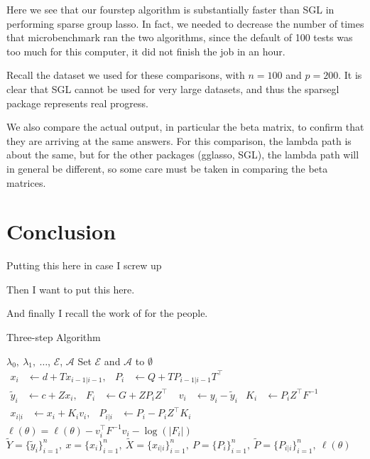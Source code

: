 \documentclass[titlepage]{article}
\begin{document}
Here we see that our fourstep algorithm is substantially faster than SGL in performing sparse group lasso. In fact, we needed to decrease the number of times that microbenchmark ran the two algorithms, since the default of 100 tests was too much for this computer, it did not finish the job in an hour.

Recall the dataset we used for these comparisons, with $n=100$ and $p=200$. It is clear that SGL cannot be used for very large datasets, and thus the sparsegl package represents real progress.


We also compare the actual output, in particular the beta matrix, to confirm that they are arriving at the same answers. For this comparison, the lambda path is about the same, but for the other packages (gglasso, SGL), the lambda path will in general be different, so some care must be taken in comparing the beta matrices.

\section{Conclusion}


Putting this here in case I screw up \citep{tibshirani2012strong}

Then I want to put this \citep{yang2015fast} here.

And finally I recall the work of \citep{simon2013sparse} for the people.

\begin{algorithm}
  \caption{Three-step Algorithm\label{alg:kalman}}
  \begin{algorithmic}
     $\lambda_0,\ \lambda_1,\ \dots$, $\mathcal{E}$, $\mathcal{A}$
    \STATE Set $\mathcal{E}$ and $\mathcal{A}$ to $\emptyset$ 
    \STATE $\begin{aligned} x_{i}
      &\leftarrow d + T x_{i-1|i-1}, & P_i &\leftarrow Q + T P_{i-1|i-1}
      T^\top\end{aligned}$ 
    \STATE $\begin{aligned}\widetilde{y}_i
      &\leftarrow c + Z  x_i, & F_i &\leftarrow G + Z P_i
      Z^\top\end{aligned}$ 
    \STATE $\begin{aligned}v_i&\leftarrow y_i-\widetilde{y}_i& K_i&
      \leftarrow P_i Z^\top F^{-1}\end{aligned}$ 
    \STATE $\begin{aligned} x_{i|i}
      &\leftarrow  x_i + K_i v_i, & P_{i|i} &\leftarrow P_i - P_iZ^\top
      K_i\end{aligned}$ 
    \STATE $\ell(\theta) = \ell(\theta) -v_i^\top F^{-1}v_i - \log(|F_i|)$
    \ENDFOR
    \RETURN $\widetilde{Y}=\{\widetilde{y}_i\}_{i=1}^n,\  x=\{ x_i\}_{i=1}^n,\
    \widetilde{X}=\{x_{i|i}\}_{i=1}^n,\ P=\{P_i\}_{i=1}^n,\
    \widetilde{P}=\{P_{i|i}\}_{i=1}^n,\ \ell(\theta)$
  \end{algorithmic}
\end{algorithm}



\end{document}
